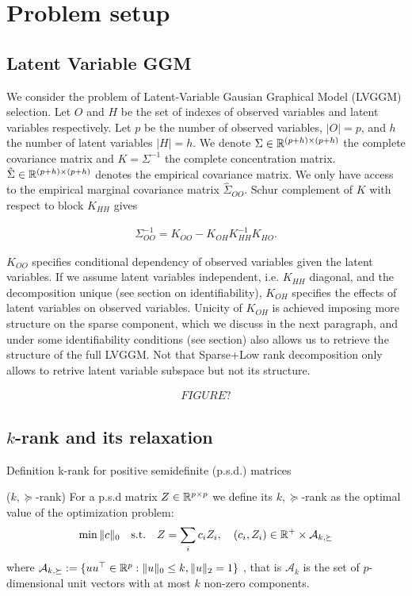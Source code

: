 \section{Problem setup}
\label{setup}

\subsection{Latent Variable GGM}
We consider the problem of Latent-Variable Gausian Graphical Model (LVGGM) selection. Let $O$ and $H$ be the set of indexes of observed variables and latent variables respectively. Let $p$ be the number of observed variables, $|O|=p$, and  $h$ the number of latent variables $|H|=h$. We denote $\Sigma\in\mathbb{R}^{(p+h)\times(p+h)}$ the complete covariance matrix and $K=\Sigma^{-1}$ the complete concentration matrix. $\hat{\Sigma}\in\mathbb{R}^{(p+h)\times(p+h)}$ denotes the empirical covariance matrix. We only have access to the empirical marginal covariance matrix $\hat{\Sigma}_{OO}$. Schur complement of $K$ with respect to block $K_{HH}$ gives 

\begin{align}
\Sigma_{OO}^{-1} = K_{OO}-K_{OH}K_{HH}^{-1}K_{HO}.
\end{align}

$K_{OO}$ specifies conditional dependency of observed variables given the latent variables. If we assume latent variables independent, i.e. $K_{HH}$ diagonal, and the decomposition unique (see section on identifiability), $K_{OH}$ specifies the effects of latent variables on observed variables. Unicity of $K_{OH}$ is achieved imposing more structure on the sparse component, which we discuss in the next paragraph, and under some identifiability conditions (see section) also allows us to retrieve the structure of the full LVGGM. Not that Sparse+Low rank decomposition only allows to retrive latent variable subspace but not its structure.

\begin{align}
FIGURE ?
\end{align}

\subsection{$k$-rank and its relaxation}

Definition k-rank for positive semidefinite (p.s.d.) matrices
\begin{mydef}
($k,\succeq$-rank) For a p.s.d  matrix $Z\in\mathbb{R}^{p\times p}$  we define its $k,\succeq$-rank as the optimal
value of the optimization problem:
\begin{align}
\min \|c\|_0 \quad \text{s.t.} \quad Z=\sum_{i} c_i Z_i, \quad (c_i,Z_i)\in \mathbb{R}^{+}\times\mathcal{A}_{k,\succeq}
\end{align}
where  $\mathcal{A}_{k,\succeq}:=\{u u^\top \in\mathbb{R}^p  :   \|u\|_0 \leq k, \|u\|_2 = 1\}$ , that is $\mathcal{A}_k$ is the set of $p$-dimensional unit vectors with at most $k$ non-zero components.
\end{mydef}

